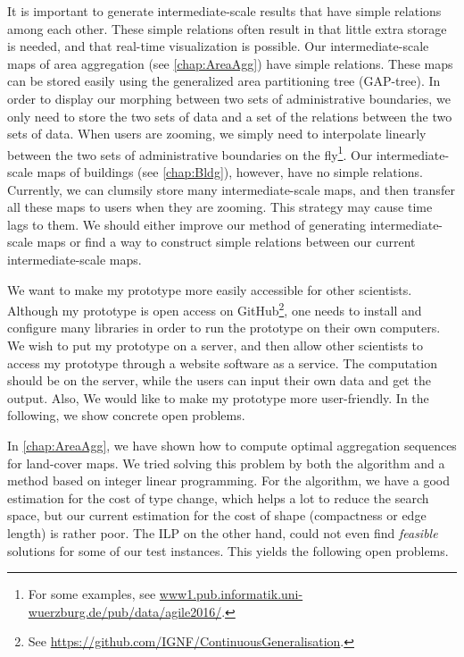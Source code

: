 It is important to generate intermediate-scale results that have 
simple relations among each other.
These simple relations often result in 
that little extra storage is needed, and 
that real-time visualization is possible.
Our intermediate-scale maps of area aggregation 
(see \chap\ref{chap:AreaAgg}) 
have simple relations.
These maps can be stored easily
using the generalized area partitioning tree (GAP-tree).
In order to display our morphing between two sets of 
administrative boundaries, we only need to store the two sets of 
data and a set of the relations between the two sets of data. 
When users are zooming,
we simply need to interpolate linearly between the two sets of 
administrative boundaries on the fly\footnote{For
some examples, see 
\url{www1.pub.informatik.uni-wuerzburg.de/pub/data/agile2016/}.}.
Our intermediate-scale maps of buildings 
(see \chap\ref{chap:Bldg}), 
however, have no simple relations.
Currently, we can clumsily store many
intermediate-scale maps,
and then transfer all these maps to users when they are zooming.
This strategy may cause time lags to them.
We should either improve our method of generating 
intermediate-scale maps or find a way 
to construct simple relations 
between our current intermediate-scale maps.

We want to make my prototype more easily accessible for other 
scientists.
Although my prototype is open access on GitHub\footnote{See 
\url{https://github.com/IGNF/ContinuousGeneralisation}.},
one needs to install and configure many libraries in order to 
run the prototype on their own computers.
We wish to put my prototype on a server, and then allow 
other scientists to access my prototype through a website
software as a service.
The computation should be on the server,
while the users can input their own data and get the output.
Also, We would like to make my prototype more user-friendly.
In the following, we show concrete open problems.

In \chap\ref{chap:AreaAgg}, we have shown how to compute optimal
aggregation sequences for %
land-cover maps.
We tried solving this problem by both the \Astar algorithm
and a method based on integer linear programming.
For the \Astar algorithm, we have a good estimation for the cost of type 
change, which helps a lot to reduce the search space, 
but our current estimation for the cost of shape (compactness or edge 
length) is rather poor.
The ILP on the other hand, could not even find \emph{feasible}
solutions for some of our test instances.
This yields the following open problems.
 
